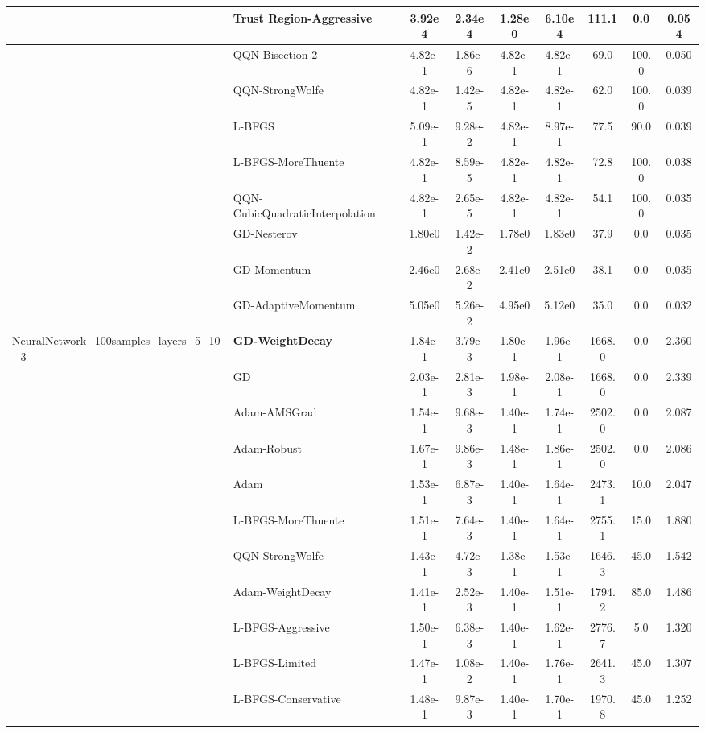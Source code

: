 \documentclass[10pt]{article}
\begin{document}
\begin{longtable}{|l|l|c|c|c|c|c|c|c|}
\hline
 & Trust Region-Aggressive & 3.92e4 & 2.34e4 & 1.28e0 & 6.10e4 & 111.1 & 0.0 & 0.054 \\
\hline
 & QQN-Bisection-2 & 4.82e-1 & 1.86e-6 & 4.82e-1 & 4.82e-1 & 69.0 & 100.0 & 0.050 \\
\hline
 & QQN-StrongWolfe & 4.82e-1 & 1.42e-5 & 4.82e-1 & 4.82e-1 & 62.0 & 100.0 & 0.039 \\
\hline
 & L-BFGS & 5.09e-1 & 9.28e-2 & 4.82e-1 & 8.97e-1 & 77.5 & 90.0 & 0.039 \\
\hline
 & L-BFGS-MoreThuente & 4.82e-1 & 8.59e-5 & 4.82e-1 & 4.82e-1 & 72.8 & 100.0 & 0.038 \\
\hline
 & QQN-CubicQuadraticInterpolation & 4.82e-1 & 2.65e-5 & 4.82e-1 & 4.82e-1 & 54.1 & 100.0 & 0.035 \\
\hline
 & GD-Nesterov & 1.80e0 & 1.42e-2 & 1.78e0 & 1.83e0 & 37.9 & 0.0 & 0.035 \\
\hline
 & GD-Momentum & 2.46e0 & 2.68e-2 & 2.41e0 & 2.51e0 & 38.1 & 0.0 & 0.035 \\
\hline
 & GD-AdaptiveMomentum & 5.05e0 & 5.26e-2 & 4.95e0 & 5.12e0 & 35.0 & 0.0 & 0.032 \\
NeuralNetwork\_100samples\_layers\_5\_10\_3 & \textbf{GD-WeightDecay} & 1.84e-1 & 3.79e-3 & 1.80e-1 & 1.96e-1 & 1668.0 & 0.0 & 2.360 \\
\hline
 & GD & 2.03e-1 & 2.81e-3 & 1.98e-1 & 2.08e-1 & 1668.0 & 0.0 & 2.339 \\
\hline
 & Adam-AMSGrad & 1.54e-1 & 9.68e-3 & 1.40e-1 & 1.74e-1 & 2502.0 & 0.0 & 2.087 \\
\hline
 & Adam-Robust & 1.67e-1 & 9.86e-3 & 1.48e-1 & 1.86e-1 & 2502.0 & 0.0 & 2.086 \\
\hline
 & Adam & 1.53e-1 & 6.87e-3 & 1.40e-1 & 1.64e-1 & 2473.1 & 10.0 & 2.047 \\
\hline
 & L-BFGS-MoreThuente & 1.51e-1 & 7.64e-3 & 1.40e-1 & 1.64e-1 & 2755.1 & 15.0 & 1.880 \\
\hline
 & QQN-StrongWolfe & 1.43e-1 & 4.72e-3 & 1.38e-1 & 1.53e-1 & 1646.3 & 45.0 & 1.542 \\
\hline
 & Adam-WeightDecay & 1.41e-1 & 2.52e-3 & 1.40e-1 & 1.51e-1 & 1794.2 & 85.0 & 1.486 \\
\hline
 & L-BFGS-Aggressive & 1.50e-1 & 6.38e-3 & 1.40e-1 & 1.62e-1 & 2776.7 & 5.0 & 1.320 \\
\hline
 & L-BFGS-Limited & 1.47e-1 & 1.08e-2 & 1.40e-1 & 1.76e-1 & 2641.3 & 45.0 & 1.307 \\
\hline
 & L-BFGS-Conservative & 1.48e-1 & 9.87e-3 & 1.40e-1 & 1.70e-1 & 1970.8 & 45.0 & 1.252 \\

\end{longtable}
\end{document}
